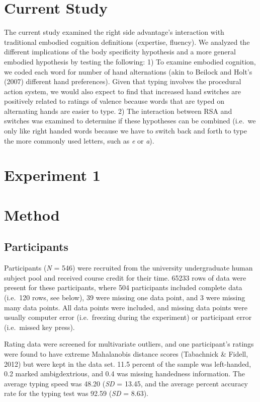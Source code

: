 \documentclass[english,man]{apa6}
\theoremstyle{definition}
\theoremstyle{definition}
\theoremstyle{definition}
\theoremstyle{remark}
\begin{document}
\section{Current Study}\label{current-study}

The current study examined the right side advantage's interaction with
traditional embodied cognition definitions (expertise, fluency). We
analyzed the different implications of the body specificity hypothesis
and a more general embodied hypothesis by testing the following: 1) To
examine embodied cognition, we coded each word for number of hand
alternations (akin to Beilock and Holt's (2007) different hand
preferences). Given that typing involves the procedural action system,
we would also expect to find that increased hand switches are positively
related to ratings of valence because words that are typed on
alternating hands are easier to type. 2) The interaction between RSA and
switches was examined to determine if these hypotheses can be combined
(i.e.~we only like right handed words because we have to switch back and
forth to type the more commonly used letters, such as \emph{e} or
\emph{a}).

\section{Experiment 1}\label{experiment-1}

\section{Method}\label{method}

\subsection{Participants}\label{participants}

Participants (\emph{N} = 546) were recruited from the university
undergraduate human subject pool and received course credit for their
time. 65233 rows of data were present for these participants, where 504
participants included complete data (i.e.~120 rows, see below), 39 were
missing one data point, and 3 were missing many data points. All data
points were included, and missing data points were usually computer
error (i.e.~freezing during the experiment) or participant error
(i.e.~missed key press).

Rating data were screened for multivariate outliers, and one
participant's ratings were found to have extreme Mahalanobis distance
scores (Tabachnick \& Fidell, 2012) but were kept in the data set. 11.5
percent of the sample was left-handed, 0.2 marked ambigdextrious, and
0.4 was missing handedness information. The average typing speed was
48.20 (\emph{SD} = 13.45, and the average percent accuracy rate for the
typing test was 92.59 (\emph{SD} = 8.63).
\end{document}

